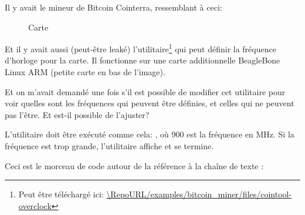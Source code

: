 
Il y avait le mineur de Bitcoin Cointerra, ressemblant à ceci:

\begin{figure}[H]
\centering
{}
\caption{Carte}
\end{figure}

Et il y avait aussi (peut-être leaké) l'utilitaire\footnote{Peut être téléchargé ici: \url{\RepoURL/examples/bitcoin_miner/files/cointool-overclock}}
qui peut définir la fréquence d'horloge pour la carte.
Il fonctionne sur une carte additionnelle BeagleBone Linux ARM (petite carte en bas
de l'image).

Et on m'avait demandé une fois s'il est possible de modifier cet utilitaire pour voir
quelles sont les fréquences qui peuvent être définies, et celles qui ne peuvent pas
l'être.
Et est-il possible de l'ajuster?

L'utilitaire doit être exécuté comme cela: , où 900
est la fréquence en MHz.
Si la fréquence est trop grande, l'utilitaire affiche  et
se termine.

Ceci est le morceau de code autour de la référence à la chaîne de texte :

